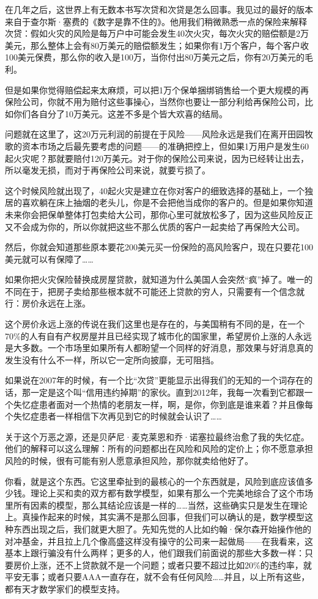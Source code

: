 在几年之后，这世界上有无数本书写次贷和次贷是怎么回事。我见过的最好的版本来自于查尔斯·塞费的《数字是靠不住的》。他用我们稍微熟悉一点的保险来解释次贷：假如火灾的风险是每万户中可能会发生40次火灾，每次火灾的赔偿额是2万美元，那么整体上会有80万美元的赔偿额发生；如果你有1万个客户，每个客户收100美元保费，那么你的收入是100万，当你付出80万美元之后，你有20万美元的毛利。

但是如果你觉得赔偿起来太麻烦，可以把1万个保单捆绑销售给一个更大规模的再保险公司，你就不用为赔付这些事操心，当然你也要让一部分利给再保险公司，比如你们各自分了10万美元。这差不多是个皆大欢喜的结局。

问题就在这里了，这20万元利润的前提在于风险------风险永远是我们在离开田园牧歌的资本市场之后最先要考虑的问题------的准确把控上，但如果1万用户是发生60起火灾呢？那就要赔付120万美元。对于你的保险公司来说，因为已经转让出去，所以毫发无损，而对于再保险公司来说，就要亏损了。

这个时候风险就出现了，40起火灾是建立在你对客户的细致选择的基础上，一个独居的喜欢躺在床上抽烟的老头儿，你是不会把他当成你的客户的。但是如果你知道未来你会把保单整体打包卖给大公司，那你心里可就放松多了，因为这些风险反正又不会成为你的，所以你就把这些不那么优质的客户一起卖给了再保险大公司。

然后，你就会知道那些原本要花200美元买一份保险的高风险客户，现在只要花100美元就可以有保障了\ldots\ldots{}

如果你把火灾保险替换成房屋贷款，就知道为什么美国人会突然``疯''掉了。唯一的不同在于，把房子卖给那些根本就不可能还上贷款的穷人，只需要有一个信念就行：房价永远在上涨。

这个房价永远上涨的传说在我们这里也是存在的，与美国稍有不同的是，在一个70\%的人有自有产权房屋并且已经实现了城市化的国家里，希望房价上涨的人永远是大多数。一个市场里如果所有人都盼望一个同样的好消息，那效果与好消息真的发生没有什么不一样，所以它一定所向披靡，无可阻挡。

如果说在2007年的时候，有一个比``次贷''更能显示出得我们的无知的一个词存在的话，那一定是这个叫``信用违约掉期''的家伙。直到2012年，我每一次看到它都跟一个失忆症患者面对一个热情的老朋友一样，啊，是你，你到底是谁来着？并且像每个失忆症患者一样相信下次再见到它的时候就会认识了\ldots\ldots{}

关于这个万恶之源，还是贝萨尼·麦克莱恩和乔·诺塞拉最终治愈了我的失忆症。他们的解释可以这么理解：所有的问题都出在风险和风险的定价上；你不愿意承担风险的时候，很有可能有别人愿意承担风险，那你就卖给他好了。

你看，就是这个东西。它这里牵扯到的最核心的一个东西就是，风险到底应该值多少钱。理论上买和卖的双方都有数学模型，如果有那么一个完美地综合了这个市场里所有因素的模型，那么其结论应该是一样的\ldots\ldots 当然，这些确实只是发生在理论上。真操作起来的时候，其实满不是那么回事，但我们可以确认的是，数学模型这种东西出现之后，我们就更大胆了。先知先觉的人比如约翰·保尔森开始操作他的对冲基金，并且拉上几个像高盛这样没有操守的公司来一起做局------在我看来，这基本上跟行骗没有什么两样；更多的人，他们跟我们前面说的那些大多数一样：只要房价上涨，还不上贷款就不是一个问题；或者只要不超过比如20\%的违约率，就平安无事；或者只要AAA一直存在，就不会有任何风险\ldots\ldots 并且，以上所有这些，都有天才数学家们的模型支持。

